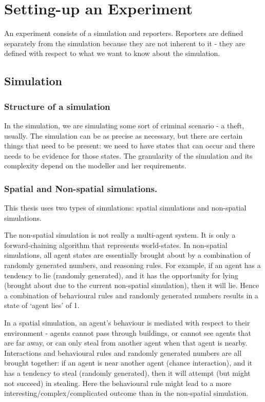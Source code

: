 \section{Setting-up an Experiment}
An experiment consists of a simulation and reporters. Reporters are defined separately from the simulation because they are not inherent to it - they are defined with respect to what we want to know about the simulation.

\subsection{Simulation}

\subsubsection{Structure of a simulation}
In the simulation, we are simulating some sort of criminal scenario - a theft, usually. The simulation can be as precise as necessary, but there are certain things that need to be present: we need to have states that can occur and there needs to be evidence for those states. The granularity of the simulation and its complexity depend on the modeller and her requirements.

\subsubsection{Spatial and Non-spatial simulations.}
This thesis uses two types of simulations: spatial simulations and non-spatial simulations. 

 The non-spatial simulation is not really a multi-agent system. It is only a forward-chaining algorithm that represents world-states. In non-spatial simulations, all agent states are essentially brought about by a combination of randomly generated numbers, and reasoning rules. For example, if an agent has a tendency to lie (randomly generated), and it has the opportunity for lying (brought about due to the current non-spatial simulation), then it will lie. Hence a combination of behavioural rules and randomly generated numbers results in a state of `agent lies' of 1.
 
 In a spatial simulation, an agent's behaviour is mediated with respect to their environment -  agents cannot pass through buildings, or cannot see agents that are far away, or can only steal from another agent when that agent is nearby.  Interactions and behavioural rules and randomly generated numbers are all brought together: if an agent is near another agent (chance interaction), and it has a tendency to steal (randomly generated), then it will attempt (but might not succeed) in stealing. Here the behavioural rule might lead to a more interesting/complex/complicated outcome than in the non-spatial simulation.


